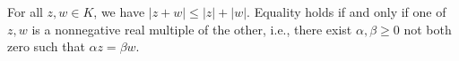 For all $z, w \in K$, we have $|z + w| \leq |z| + |w|$. Equality holds if and only if one of $z, w$ is a nonnegative real multiple of the other, i.e., there exist $\alpha, \beta \geq 0$ not both zero such that $\alpha z = \beta w$.